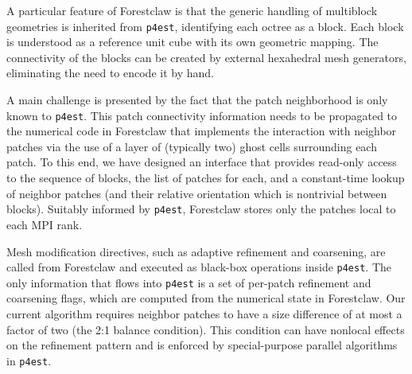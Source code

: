 \documentclass{IOS-Book-Article}     %
\newcommand{\clawpack}{{\sc Clawpack}\xspace}
\newcommand{\forestclaw}{Forestclaw\xspace}
\newcommand{\pforest}{\texttt{p4est}\xspace}
\begin{document}
A particular feature of \forestclaw is that the generic handling of multiblock
geometries is inherited from \pforest, identifying each octree as a block.
Each block is understood as a reference unit cube with
its own geometric mapping.  The connectivity of the blocks can be created by
external hexahedral mesh generators, eliminating the need to encode it by hand.

A main challenge is presented by the fact that the patch neighborhood
is only known to \pforest.  This patch connectivity information needs
to be propagated to the numerical code in \forestclaw that implements
the interaction with neighbor patches via the use of a layer of (typically two)
ghost cells surrounding each patch.  To this end, we have designed an
interface that provides read-only access to the sequence of blocks, the list of
patches for each, and a constant-time lookup of neighbor patches (and their
relative orientation which is nontrivial between blocks).
Suitably informed by \pforest, \forestclaw stores only the patches local to
each MPI rank.

Mesh modification directives, such as adaptive refinement and coarsening, are
called from \forestclaw and executed as black-box operations inside \pforest.
The only information that flows into \pforest is a set of per-patch
refinement and coarsening flags, which are computed from the numerical state in
\forestclaw.  Our current algorithm requires neighbor patches to have a size
difference of at most a factor of two (the 2:1 balance condition).  This condition
can have nonlocal effects on the refinement pattern and is enforced by
special-purpose parallel algorithms in \pforest \cite{IsaacBursteddeGhattas12}.








\end{document}
